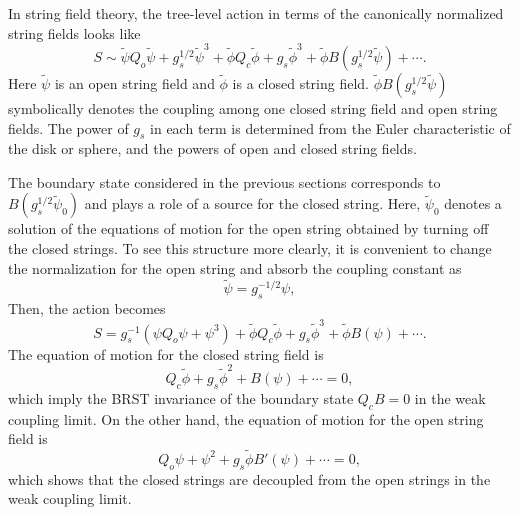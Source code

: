 \documentclass[a4paper,12pt]{article} \textheight=8.5truein
\begin{document}
In string field theory, the tree-level action in terms of the
canonically normalized string fields looks like
\cite{Zwiebach:1997fe}
\begin{equation}
  \label{eq:action}
  S\sim\tilde{\psi} Q_o \tilde{\psi} +g_s^{1/2} \tilde{\psi}^3+
\tilde{\phi} Q_c \tilde{\phi} + g_s \tilde{\phi}^3+
 \tilde{\phi}B(g_s^{1/2}\tilde{\psi})+\cdots.
\end{equation}
Here $\tilde{\psi}$ is an open string field and $\tilde{\phi}$
is a closed string field. $\tilde\phi B(g_s^{1/2}\tilde\psi)$
symbolically denotes the coupling among one closed string field
and open string fields. The power of $g_s$ in each term is
determined from the Euler characteristic of the disk or sphere,
and the powers of open and closed string fields.

The boundary state considered in the previous sections corresponds
to $B(g_s^{1/2}\tilde\psi_0)$
and plays a role of a source for the closed string.
Here, $\tilde\psi_0$ denotes a solution of the equations of motion
for the open string obtained by turning off the closed strings.
To see this structure more clearly, it is convenient to
change the normalization for the open string and
absorb the coupling constant as
\begin{equation}
  \label{eq:normalization}
  \tilde{\psi}=g_s^{-1/2}\psi,
\end{equation}
Then, the action becomes
\begin{equation}
  \label{eq:action2}
    S=g_s^{-1}(\psi Q_o \psi + \psi^3)+
 \tilde{\phi} Q_c \tilde{\phi} + g_s \tilde{\phi}^3+
 \tilde{\phi}B(\psi)+\cdots.
\end{equation}
The equation of motion for the closed string field is
\begin{equation}
\label{closedEOM}
  Q_c\tilde\phi+g_s\tilde\phi^2+ B(\psi) +\cdots=0,
\end{equation}
which imply the BRST invariance of the boundary state
$Q_c B=0$ in the weak coupling limit.
On the other hand, the equation of motion for the open string field is
\begin{equation}
  \label{eq:eom}
  Q_o\psi+\psi^2+g_s \tilde\phi B'(\psi)+\cdots=0,
\end{equation}
which shows that the closed strings are decoupled from the open
strings in the weak coupling limit.
\end{document}
